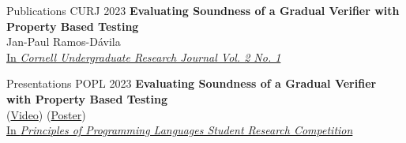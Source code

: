 
\begin{rSection}{Publications}
	\large{CURJ 2023} \phantom{} \hspace{3.5mm} \textbf{Evaluating Soundness of a Gradual Verifier with Property Based Testing}
	\\ 
	\phantom{} \hspace{2.6cm} \small{Jan-Paul Ramos-D{\'a}vila}\normalsize{}
	\\
	\phantom{} \hspace{2.6cm} \color{darkgray}\small{\href{https://journals.library.cornell.edu/index.php/CURJ/}{In \textit{Cornell Undergraduate Research Journal Vol. 2 No. 1} \ExternalLink}}
\end{rSection}

\begin{rSection}{Presentations}
	\large{POPL 2023} \phantom{} \hspace{3.5mm} \textbf{Evaluating Soundness of a Gradual Verifier with Property Based Testing}
	\\ 
	\phantom{} \hspace{2.6cm} \small{(\href{https://www.youtube.com/watch?v=sIIwmw0z2Yg}{Video\ExternalLink}) (\href{https://jpramos.me/data/pdf/POPL%2023%20SRC%20POSTER.pdf}{Poster\ExternalLink})}\normalsize{} 
	\\
	\phantom{} \hspace{2.6cm} \color{darkgray}\small{\href{https://popl23.sigplan.org/details/POPL-2023-student-research-competition/13/Evaluating-Soundness-of-a-Gradual-Verifier-with-Property-Based-Testing}{In \textit{Principles of Programming Languages Student Research Competition} \ExternalLink}}
\end{rSection}
